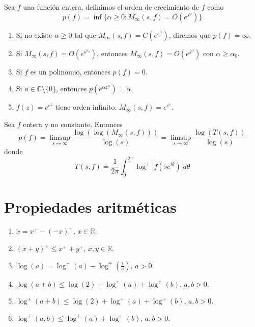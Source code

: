 \begin{definition}
    Sea $f$ una función entera, definimos el orden de crecimiento de $f$ como
    $$p(f) = \inf\{\alpha \geq 0 : M_\infty(s, f) = O(e^{s^\alpha})\}$$
\end{definition}

\begin{remark}
    \hfill
    \begin{enumerate}
        \item Si no existe $\alpha \geq 0$ tal que $M_\infty(s, f) = C(e^{s^\alpha})$, diremos que $p(f) = \infty$.
        \item Si $M_\infty(s, f) = O(e^{s^{\alpha_0}})$, entonces $M_\infty(s, f) = O(e^{s^\alpha})$ con $\alpha \geq \alpha_0$.
        \item Si $f$ es un polinomio, entonces $p(f) = 0$.
        \item Si $a \in \mathbb{C} \setminus \{0\}$, entonces $p(e^{\alpha z^\alpha}) = \alpha$.
        \item $f(z) = e^{e^z}$ tiene orden infinito.
              $M_\infty(s, f) = e^{e^s}$.
    \end{enumerate}
\end{remark}

\begin{proposition}
    Sea $f$ entera y no constante.
    Entonces
    $$p(f) = \limsup_{s \to \infty} \frac{\log(\log(M_\infty(s, f)))}{\log(s)} = \limsup_{s \to \infty} \frac{\log(T(s, f))}{\log(s)}$$
    donde
    $$T(s, f) = \frac{1}{2\pi} \int_0^{2\pi} \log^+|f(se^{i\theta})|d\theta$$
\end{proposition}


\section{Propiedades aritméticas}
\begin{lemma}
    \hfill
    \begin{enumerate}
        \item $x = x^+ - (-x)^+$, $x \in \mathbb{R}$.
        \item $(x+y)^+ \leq x^+ + y^+$, $x, y \in \mathbb{R}$.
        \item $\log(a) = \log^+(a) - \log^+\left(\frac{1}{a}\right)$, $a > 0$.
        \item $\log(a+b) \leq \log(2) + \log^+(a) + \log^+(b)$, $a, b > 0$.
        \item $\log^+(a+b) \leq \log(2) + \log^+(a) + \log^+(b)$, $a, b > 0$.
        \item $\log^+(a,b) \leq \log^+(a) + \log^+(b)$, $a, b > 0$.
    \end{enumerate}
\end{lemma}

